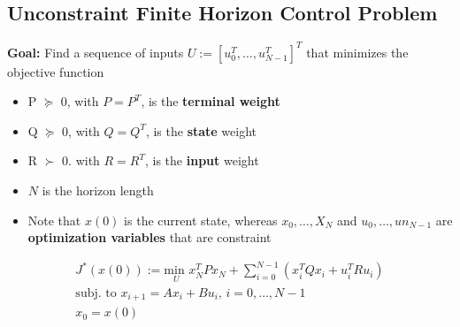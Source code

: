 \subsection{Unconstraint Finite Horizon Control Problem}
\textbf{Goal:} Find a sequence of inputs $U:=[u_0^T,\dots,u_{N-1}^T]^T$ that minimizes the objective function
\begin{itemize}
    \item P $\succeq$ 0, with $P=P^T$, is the \textbf{terminal weight}
    \item Q $\succeq$ 0, with $Q=Q^T$, is the \textbf{state} weight
    \item R $\succ$ 0. with $R=R^T$, is the \textbf{input} weight
    \item $N$ is the horizon length
    \item Note that $x(0)$ is the current state, whereas $x_0,\dots,X_N$ and $u_0,\dots,un_{N-1}$ are \textbf{optimization variables} that are constraint
\end{itemize}

\begin{gather*}
    J^*(x(0)) := \underset{U}{\textrm{min }}x_N^TPx_N+\sum^{N-1}_{i=0}(x_i^TQx_i+u_i^TRu_i)\\
    \textrm{subj. to }x_{i+1}=Ax_i+Bu_i\textrm{, } i = 0,\dots,N-1\\
    x_0 = x(0)
\end{gather*}

